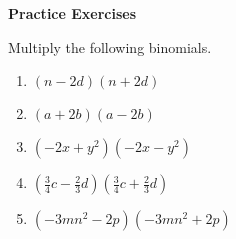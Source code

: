 \textbf{Practice Exercises}

\vspce

Multiply the following binomials.
\begin{enumerate}
\item  \hspce $(n-2d)(n+2d)$
\item  \hspce $(a+2b)(a-2b)$
\item  \hspce $(-2x+y^{2})(-2x-y^{2})$
\item  \hspce $(\frac{3}{4}c-\frac{2}{3}d)(\frac{3}{4}c+\frac{2}{3}d)$
\item  \hspce $(-3mn^{2}-2p)(-3mn^{2}+2p)$
\end{enumerate}